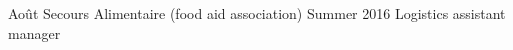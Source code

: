 \begin{cventries}

  \cventry
    {Août Secours Alimentaire (food aid association)} %
    {Summer 2016} %
    {Logistics assistant manager} %


\end{cventries}
